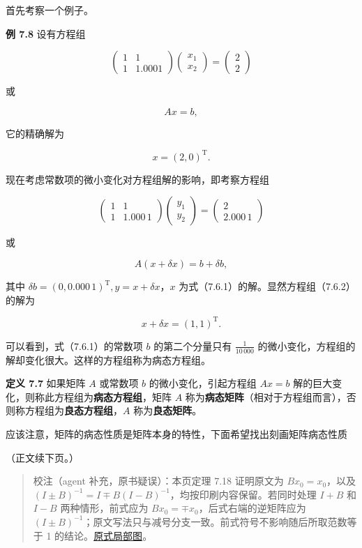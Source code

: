 \documentclass[
  10pt,
  fontset=fandol]{ctexart}
\begin{document}
首先考察一个例子。

\textbf{例 7.8} 设有方程组

\[
\begin{pmatrix}1&1\\1&1.0001\end{pmatrix}
\begin{pmatrix}x_1\\x_2\end{pmatrix}
=\begin{pmatrix}2\\2\end{pmatrix}
\]

或

\[
Ax=b,
\tag{7.6.1}
\]

它的精确解为

\[
x=(2,0)^{\mathrm T}.
\]

现在考虑常数项的微小变化对方程组解的影响，即考察方程组

\[
\begin{pmatrix}1&1\\1&1.000\,1\end{pmatrix}
\begin{pmatrix}y_1\\y_2\end{pmatrix}
=\begin{pmatrix}2\\2.000\,1\end{pmatrix}
\]

或

\[
A(x+\delta x)=b+\delta b,
\tag{7.6.2}
\]

其中 \(\delta b=(0,0.000\,1)^{\mathrm T},y=x+\delta x\)，\(x\)
为式（7.6.1）的解。显然方程组（7.6.2）的解为

\[
x+\delta x=(1,1)^{\mathrm T}.
\]

可以看到，式（7.6.1）的常数项 \(b\) 的第二个分量只有 \(\frac1{10\,000}\)
的微小变化，方程组的解却变化很大。这样的方程组称为病态方程组。

\textbf{定义 7.7} 如果矩阵 \(A\) 或常数项 \(b\) 的微小变化，引起方程组
\(Ax=b\) 解的巨大变化，则称此方程组为\textbf{病态方程组}，矩阵 \(A\)
称为\textbf{病态矩阵}（相对于方程组而言），否则称方程组为\textbf{良态方程组}，\(A\)
称为\textbf{良态矩阵}。

应该注意，矩阵的病态性质是矩阵本身的特性，下面希望找出刻画矩阵病态性质

（正文续下页。）

\begin{quote}
校注（agent 补充，原书疑误）：本页定理 7.18 证明原文为
\(Bx_0=x_0\)，以及
\((I\pm B)^{-1}=I\mp B(I-B)^{-1}\)，均按印刷内容保留。若同时处理 \(I+B\)
和 \(I-B\) 两种情形，前式应为 \(Bx_0=\mp x_0\)，后式右端的逆矩阵应为
\((I\pm B)^{-1}\)；原文写法只与减号分支一致。前式符号不影响随后所取范数等于
1
的结论。\href{../../../staging/ch07b/assets/205-inverse-signs.png}{原式局部图}。
\end{quote}
\end{document}
